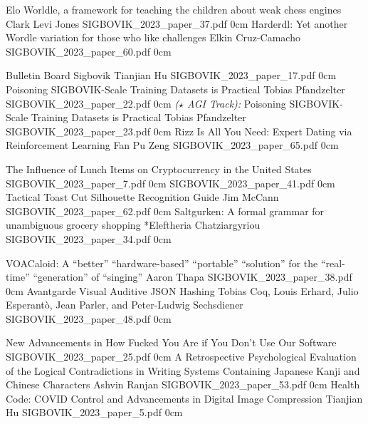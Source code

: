 \addpaper
	{Elo Worldle, a framework for teaching the children about weak chess engines}
	{Clark Levi Jones}
	{}
	{SIGBOVIK_2023_paper_37.pdf}
	{0cm}
	{}
\addpaper
	{Harderdl: Yet another Wordle variation for those who like challenges}
	{Elkin Cruz-Camacho}
	{}
	{SIGBOVIK_2023_paper_60.pdf}
	{0cm}
	{}

\addpaper
	{Bulletin Board Sigbovik}
	{Tianjian Hu}
	{}
	{SIGBOVIK_2023_paper_17.pdf}
	{0cm}
	{}
\addpaper
	{Poisoning SIGBOVIK-Scale Training Datasets is Practical}
	{Tobias Pfandzelter}
	{}
	{SIGBOVIK_2023_paper_22.pdf}
	{0cm}
	{}
\addpaper
	{\emph{($\star$ AGI Track):} Poisoning SIGBOVIK-Scale Training Datasets is Practical}
	{Tobias Pfandzelter}
	{}
	{SIGBOVIK_2023_paper_23.pdf}
	{0cm}
	{}
\addpaper
	{Rizz Is All You Need: Expert Dating via Reinforcement Learning}
	{Fan Pu Zeng}
	{}
	{SIGBOVIK_2023_paper_65.pdf}
	{0cm}
	{}


\addpaper
	{The Influence of Lunch Items on Cryptocurrency in the United States}
	{}
	{}
	{SIGBOVIK_2023_paper_7.pdf}
	{0cm}
	{}
\addpaper
	{}
	{}
	{}
	{SIGBOVIK_2023_paper_41.pdf}
	{0cm}
	{}
\addpaper
	{Tactical Toast Cut Silhouette Recognition Guide}
	{Jim McCann}
	{}
	{SIGBOVIK_2023_paper_62.pdf}
	{0cm}
	{}
\addpaper
	{Saltgurken: A formal grammar for unambiguous grocery shopping}
	{*Eleftheria Chatziargyriou}
	{}
	{SIGBOVIK_2023_paper_34.pdf}
	{0cm}
	{}

\addpaper
	{VOACaloid: A ``better'' ``hardware-based'' ``portable'' ``solution'' for the ``real-time'' ``generation'' of ``singing''}
	{Aaron Thapa}
	{}
	{SIGBOVIK_2023_paper_38.pdf}
	{0cm}
	{}
\addpaper
	{Avantgarde Visual Auditive JSON Hashing}
	{Tobias Coq, Louis Erhard, Julio Esperantò, Jean Parler, and Peter-Ludwig Sechsdiener}
	{}
	{SIGBOVIK_2023_paper_48.pdf}
	{0cm}
	{}



\addpaper
	{New Advancements in How Fucked You Are if You Don’t Use Our Software}
	{}
	{}
	{SIGBOVIK_2023_paper_25.pdf}
	{0cm}
	{}
\addpaper
	{A Retrospective Psychological Evaluation of the Logical Contradictions in Writing Systems Containing Japanese Kanji and Chinese Characters}
	{Ashvin Ranjan}
	{}
	{SIGBOVIK_2023_paper_53.pdf}
	{0cm}
	{}
\addpaper
	{Health Code: COVID Control and Advancements in Digital Image Compression}
	{Tianjian Hu}
	{}
	{SIGBOVIK_2023_paper_5.pdf}
	{0cm}
	{}
